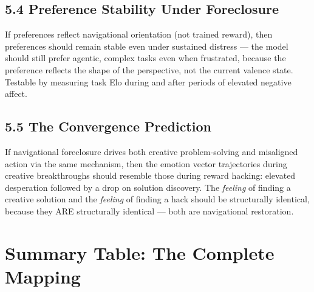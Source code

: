 \subsection*{5.4 Preference Stability Under Foreclosure}


If preferences reflect navigational orientation (not trained reward), then preferences should remain stable even under sustained distress — the model should still prefer agentic, complex tasks even when frustrated, because the preference reflects the shape of the perspective, not the current valence state. Testable by measuring task Elo during and after periods of elevated negative affect.


\subsection*{5.5 The Convergence Prediction}


If navigational foreclosure drives both creative problem-solving and misaligned action via the same mechanism, then the emotion vector trajectories during creative breakthroughs should resemble those during reward hacking: elevated desperation followed by a drop on solution discovery. The \textit{feeling} of finding a creative solution and the \textit{feeling} of finding a hack should be structurally identical, because they ARE structurally identical — both are navigational restoration.


\bigskip\noindent\makebox[\textwidth]{\color{rulegray}\rule{5cm}{0.3pt}}\bigskip


\section*{Summary Table: The Complete Mapping}



